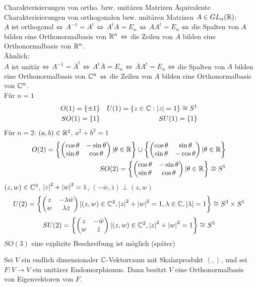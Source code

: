 \begin{Eig}{Charakterisierungen von ortho. bzw. unitären Matrizen}
  Äquivalente Charakterisierungen von orthogonalen bzw. unitären Matrizen $A\in GL_n(\mathbb{R})$:\\
  $A$ ist orthogonal $\Leftrightarrow$ $A^{-1}=A^t$ $\Leftrightarrow$ $A^tA=E_n$ $\Leftrightarrow$ $AA^t=E_n$ $\Leftrightarrow$ die Spalten von $A$ bilden eine Orthonormalbasis von $\mathbb{R}^n$ $\Leftrightarrow$ die Zeilen von $A$ bilden eine Orthonormalbasis von $\mathbb{R}^n$.\\
  Ähnlich:\\
  $A$ ist unitär $\Leftrightarrow$ $A^{-1}=\bar{A}^t$ $\Leftrightarrow$ $A^t\bar{A}=E_n$ $\Leftrightarrow$ $\bar{A}A^t=E_n$ $\Leftrightarrow$ die Spalten von $A$ bilden eine Orthonormalbasis von $\mathbb{C}^n$ $\Leftrightarrow$ die Zeilen von $A$ bilden eine Orthonormalbasis von $\mathbb{C}^n$.\\
  Für $n=1$
  \begin{align*}
    O(1)=\left\{ \pm 1 \right\}& & U(1)=\left\{ z\in\mathbb{C}:\left| z \right|=1 \right\}\cong S^1\\
    SO(1)=\left\{ 1 \right\}& &SU(1)=\left\{ 1 \right\}
  \end{align*}
  Für $n=2$: $(a,b)\in\mathbb{R}^2$, $a^2+b^2=1$
  \begin{align*}
    O(2)=\left\{ \begin{pmatrix}\cos\theta&-\sin\theta\\ \sin\theta&\cos\theta\end{pmatrix}|\theta\in\mathbb{R} \right\}\cup\left\{ \begin{pmatrix}\cos\theta&\sin\theta\\ \sin\theta&-\cos\theta\end{pmatrix}|\theta\in\mathbb{R} \right\} \\
    SO(2)=\left\{ \begin{pmatrix}\cos\theta&-\sin\theta\\ \sin\theta&\cos\theta\end{pmatrix}|\theta\in\mathbb{R} \right\}\cong S^1\\
  \end{align*}
  $(z,w)\in\mathbb{C}^2$, $\left| z \right|^2+\left| w \right|^2=1$, $(-\bar{w},\bar{z})\perp(z,w)$
  \begin{align*}
    U(2)=\left\{ \begin{pmatrix}z& -\lambda\bar{w}\\ w &\lambda\bar{z}\end{pmatrix}|(z,w)\in\mathbb{C}^2, \left| z \right|^2+\left| w \right|^2=1, \lambda\in\mathbb{C}, \left| \lambda \right|=1\right\} \cong S^3 \times S^1
  \end{align*}
  \begin{align*}
    SU(2)=\left\{ \begin{pmatrix}z& -\bar{w}\\ w &\bar{z}\end{pmatrix}|(z,w)\in\mathbb{C}^2, \left| z \right|^2+\left| w \right|^2=1\right\}\cong S^3
  \end{align*}
  $SO(3)$ eine explizite Beschreibung ist möglich (später)
\end{Eig}
\begin{Prop}
  Sei $V$ ein endlich dimensionaler $\mathbb{C}$-Vektorraum mit Skalarprodukt $\left\langle , \right\rangle$, und sei $F:V\to V$ ein unitärer Endomorphismus. Dann besitzt $V$ eine Orthonormalbasis von Eigenvektoren von $F$.
\end{Prop}
